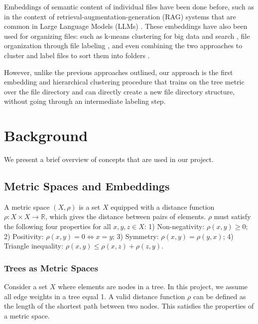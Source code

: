 \documentclass{article}
\begin{document}
Embeddings of semantic content of individual files have been done before, such as in the context of retrieval-augmentation-generation (RAG) systems that are common in Large Language Models (LLMs) \cite{caspari2024beyond}. These embeddings have also been used for organizing files: such as k-means clustering for big data and search \cite{laxmi2020charismatic}, file organization through file labeling \cite{abbas2023automated}, and even combining the two approaches to cluster and label files to sort them into folders \cite{raza2022content}.

However, unlike the previous approaches outlined, our approach is the first embedding and hierarchical clustering procedure that trains on the tree metric over the file directory and can directly create a new file directory structure, without going through an intermediate labeling step.

\section{Background}

We present a brief overview of concepts that are used in our project.

\subsection{Metric Spaces and Embeddings}

A metric space $(X, \rho)$ is a set $X$ equipped with a distance function $\rho: X \times X \rightarrow \mathbb{R}$, which gives the distance between pairs of elements. $\rho$ must satisfy the following four properties for all $x,y,z \in X$: 1) Non-negativity: $\rho(x,y) \geq 0$; 2) Positivity: $\rho(x,y) = 0 \iff x = y$; 3) Symmetry: $\rho(x,y) = \rho(y,x)$; 4) Triangle inequality: $\rho(x,y) \leq \rho(x,z) + \rho(z,y)$.

\subsubsection{Trees as Metric Spaces}

Consider a set $X$ where elements are nodes in a tree. In this project, we assume all edge weights in a tree equal 1. A valid distance function $\rho$ can be defined as the length of the shortest path between two nodes. This satisfies the properties of a metric space.
\end{document}

